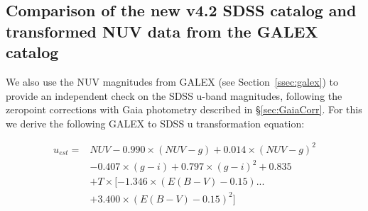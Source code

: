 \documentclass[fleqn,usenatbib]{mnras}
\begin{document}
\subsection{Comparison of the new v4.2 SDSS catalog and transformed NUV data from the GALEX catalog  \label{sec:Galextest}} 

We also use the NUV magnitudes from GALEX (see
Section~\ref{ssec:galex}) to provide an independent check on the SDSS
u-band magnitudes, following the zeropoint corrections with Gaia
photometry described in \S \ref{sec:GaiaCorr}. For this we derive the
following GALEX to SDSS u transformation equation:

\begin{equation}
\begin{split}
u_{est} = & NUV - 0.990\times(NUV - g) + 0.014\times(NUV  - g)^2  \\
         & -0.407\times(g - i) + 0.797\times(g - i)^2 + 0.835  \\
         & + T \times [ -1.346\times(E(B-V)-0.15) ... \\
         & + 3.400\times(E(B-V)-0.15)^{2} ] \\
\end{split}
\end{equation}
\end{document}
